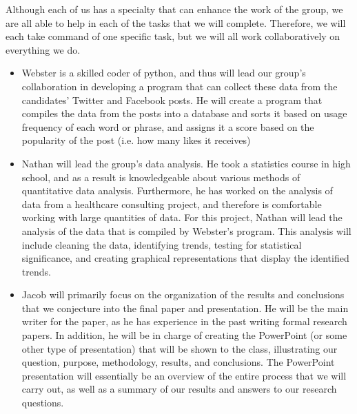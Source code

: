 \documentclass{article}
\begin{document}
\clearpage
Although each of us has a specialty that can enhance the work of the group, we are all able to help in each of the tasks that we will complete. Therefore, we will each take command of one specific task, but we will all work collaboratively on everything we do.\\
\begin{itemize}
	\item Webster is a skilled coder of python, and thus will lead our group’s collaboration in developing a program that can collect these data from the candidates’ Twitter and Facebook posts. He will create a program that compiles the data from the posts into a database and sorts it based on usage frequency of each word or phrase, and assigns it a score based on the popularity of the post (i.e. how many likes it receives)
	\item Nathan will lead the group’s data analysis. He took a statistics course in high school, and as a result is knowledgeable about various methods of quantitative data analysis. Furthermore, he has worked on the analysis of data from a healthcare consulting project, and therefore is comfortable working with large quantities of data. For this project, Nathan will lead the analysis of the data that is compiled by Webster’s program. This analysis will include cleaning the data, identifying trends, testing for statistical significance, and creating graphical representations that display the identified trends.
	\item Jacob will primarily focus on the organization of the results and conclusions that we conjecture into the final paper and presentation. He will be the main writer for the paper, as he has experience in the past writing formal research papers. In addition, he will be in charge of creating the PowerPoint (or some other type of presentation) that will be shown to the class, illustrating our question, purpose, methodology, results, and conclusions. The PowerPoint presentation will essentially be an overview of the entire process that we will carry out, as well as a summary of our results and answers to our research questions.
\end{itemize}
\end{document}

